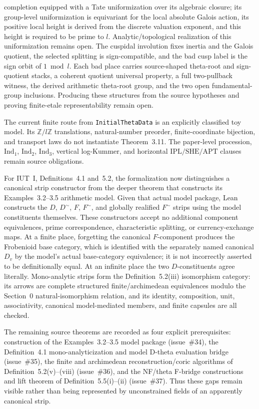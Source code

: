 \documentclass[11pt]{article}
\newcommand{\IndOne}{\ensuremath{\mathrm{Ind}_1}}
\newcommand{\IndTwo}{\ensuremath{\mathrm{Ind}_2}}
\newcommand{\IndThree}{\ensuremath{\mathrm{Ind}_3}}
\newcommand{\SHE}{\ensuremath{\mathrm{SHE}}}
\newcommand{\IPL}{\ensuremath{\mathrm{IPL}}}
\newcommand{\APT}{\ensuremath{\mathrm{APT}}}
\theoremstyle{plain}
\theoremstyle{definition}
\theoremstyle{remark}
\begin{document}
completion equipped with a Tate uniformization over its algebraic closure; its
group-level uniformization is equivariant for the local absolute Galois action,
its positive local height is derived from the discrete valuation exponent,
and this height is required to be prime to \(l\).
Analytic/topological realization of this uniformization remains open.
The cuspidal involution fixes inertia and the Galois quotient, the selected
splitting is sign-compatible, and the bad cusp label is the sign orbit of
\(1\bmod l\).  Each bad place carries source-shaped theta-root and
sign-quotient stacks, a coherent quotient universal property, a full
two-pullback witness, the derived arithmetic theta-root group, and the two
open fundamental-group inclusions.  Producing these structures from the
source hypotheses and proving finite-etale representability remain open.

The current finite route from \texttt{InitialThetaData} is an explicitly
classified toy model. Its \(\mathbb Z/l\mathbb Z\) translations,
natural-number preorder, finite-coordinate bijection, and transport laws do
not instantiate Theorem~3.11. The paper-level procession, \(\IndOne\),
\(\IndTwo\), \(\IndThree\), vertical log-Kummer, and horizontal
\(\IPL/\SHE/\APT\) clauses remain source obligations.

For IUT~I, Definitions~4.1 and~5.2, the formalization now distinguishes a
canonical strip constructor from the deeper theorem that constructs its
Examples~3.2--3.5 arithmetic model.  Given that actual model package, Lean
constructs the \(D\), \(D^{\sim}\), \(F\), \(F^{\sim}\), and globally
realified \(F^{\sim}\) strips using the model constituents themselves.  These
constructors accept no additional component equivalences, prime
correspondence, characteristic splitting, or currency-exchange maps.  At a
finite place, forgetting the canonical \(F\)-component produces the
Frobenioid base category, which is identified with the separately named
canonical \(D_v\) by the model's actual base-category equivalence; it is not
incorrectly asserted to be definitionally equal.  At an infinite place the
two \(D\)-constituents agree literally.  Mono-analytic strips form the
Definition~5.2(iii) isomorphism category: its arrows are complete structured
finite/archimedean equivalences modulo the Section~0 natural-isomorphism
relation, and its identity, composition, unit, associativity, canonical
model-mediated members, and finite capsules are all checked.

The remaining source theorems are recorded as four explicit prerequisites:
construction of the Examples~3.2--3.5 model package (issue~\#34), the
Definition~4.1 mono-analyticization and model D-theta evaluation bridge
(issue~\#35), the finite and archimedean reconstruction/coric algorithms of
Definition~5.2(v)--(viii) (issue~\#36), and the NF/theta F-bridge
constructions and lift theorem of Definition~5.5(i)--(ii) (issue~\#37).
Thus these gaps remain visible rather than being represented by unconstrained
fields of an apparently canonical strip.
\end{document}
